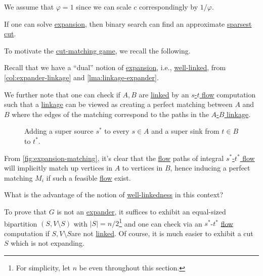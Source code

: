 \begin{note}
	We assume that \(\varphi = 1\) since we can scale \(c\) correspondingly by \(1 / \varphi \).
\end{note}

\begin{remark}
	If one can solve \hyperref[prb:expansion]{expansion}, then binary search can find an approximate \hyperref[prb:sparsest-cut]{sparsest cut}.
\end{remark}

To motivate the \hyperref[def:cut-matching-game]{cut-matching game}, we recall the following.

\begin{prev}
	Recall that we have a ``dual'' notion of \hyperref[def:expansion]{expansion}, i.e., \hyperref[def:well-linked]{well-linked}, from \autoref{col:expander-linkage} and \autoref{lma:linkage-expander}.
\end{prev}

We further note that one can check if \(A, B\) are \hyperref[def:linkage]{linked} by an \hyperref[prb:s-t-max-flow]{\(s\)-\(t\) flow} computation such that a \hyperref[def:linkage]{linkage} can be viewed as creating a perfect matching between \(A\) and \(B\) where the edges of the matching correspond to the paths in the \hyperref[def:linkage]{\(A\)-\(B\) linkage}.

\begin{center}
	\begin{figure}[H]
		\centering
		\caption{Adding a super source \(s^{\ast} \) to every \(s \in A\) and a super sink from \(t \in B\) to \(t^{\ast} \).}
		\label{fig:expansion-matching}
	\end{figure}
\end{center}

From \autoref{fig:expansion-matching}, it's clear that the \hyperref[def:flow]{flow} paths of integral \hyperref[prb:s-t-max-flow]{\(s^{\ast} \)-\(t^{\ast} \) flow} will implicitly match up vertices in \(A\) to vertices in \(B\), hence inducing a perfect matching \(M_i\) if such a feasible \hyperref[def:flow]{flow} exist.

\begin{problem*}
	What is the advantage of the notion of \hyperref[def:well-linked]{well-linkedness} in this context?
\end{problem*}
\begin{answer}
	To prove that \(G\) is not an \hyperref[def:expander]{expander}, it suffices to exhibit an equal-sized bipartition \((S, V\setminus S)\) with \(\lvert S \rvert = n / 2\)\footnote{For simplicity, let \(n\) be even throughout this section.} and one can check via an \(s^{\ast} \)-\(t^{\ast} \) \hyperref[def:flow]{flow} computation if \(S, V\setminus S\)are not \hyperref[def:linkage]{linked}. Of course, it is much easier to exhibit a cut \(S\) which is not expanding.
\end{answer}

